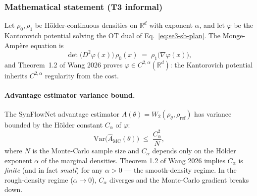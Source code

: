\subsubsection{Mathematical statement (T3 informal)}
\label{sec:method:wasserstein-foundations-t3}

Let $\rho_0, \rho_1$ be H\"older-continuous densities on
$\mathbb{R}^{d}$ with exponent $\alpha$, and let $\varphi$ be the
Kantorovich potential solving the OT dual of Eq.~\eqref{eq:se3-sb-plan}.
The Monge-Amp\`ere equation is
\begin{equation}
  \label{eq:monge-ampere}
  \det\bigl(D^{2} \varphi(x)\bigr)\, \rho_0(x) \;=\; \rho_1\!\bigl(\nabla \varphi(x)\bigr),
\end{equation}
and Theorem~1.2 of Wang 2026 \cite{wang2026ma_regularity} proves
$\varphi \in C^{2, \alpha}(\mathbb{R}^{d})$: the Kantorovich
potential inherits $C^{2, \alpha}$ regularity from the cost.

\paragraph{Advantage estimator variance bound.}
The SynFlowNet advantage estimator
$A(\theta) = W_2(\rho_{\theta}, \rho_{\mathrm{ref}})$ has variance
bounded by the H\"older constant $C_{\alpha}$ of $\varphi$:
\begin{equation}
  \label{eq:advantage-variance-bound}
  \mathrm{Var}\!\bigl(\hat{A}_{\mathrm{MC}}(\theta)\bigr)
  \;\le\; \frac{C_{\alpha}^{2}}{N},
\end{equation}
where $N$ is the Monte-Carlo sample size and $C_{\alpha}$ depends
only on the H\"older exponent $\alpha$ of the marginal densities.
Theorem 1.2 of Wang 2026 implies $C_{\alpha}$ is \emph{finite} (and
in fact \emph{small}) for any $\alpha > 0$ --- the smooth-density
regime.  In the rough-density regime ($\alpha \to 0$), $C_{\alpha}$
diverges and the Monte-Carlo gradient breaks down.


